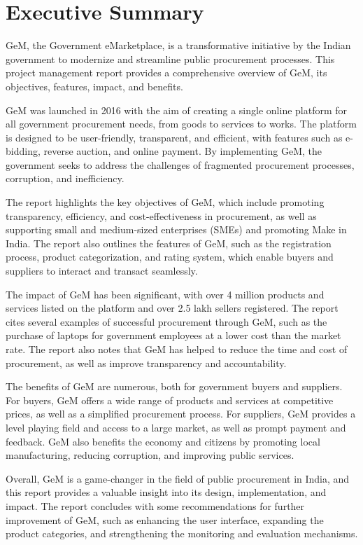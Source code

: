 \newpage
{}
\section*{Executive Summary}
GeM, the Government eMarketplace, is a transformative initiative by the Indian government to modernize and streamline public procurement processes. This project management report provides a comprehensive overview of GeM, its objectives, features, impact, and benefits.

GeM was launched in 2016 with the aim of creating a single online platform for all government procurement needs, from goods to services to works. The platform is designed to be user-friendly, transparent, and efficient, with features such as e-bidding, reverse auction, and online payment. By implementing GeM, the government seeks to address the challenges of fragmented procurement processes, corruption, and inefficiency.

The report highlights the key objectives of GeM, which include promoting transparency, efficiency, and cost-effectiveness in procurement, as well as supporting small and medium-sized enterprises (SMEs) and promoting Make in India. The report also outlines the features of GeM, such as the registration process, product categorization, and rating system, which enable buyers and suppliers to interact and transact seamlessly.

The impact of GeM has been significant, with over 4 million products and services listed on the platform and over 2.5 lakh sellers registered. The report cites several examples of successful procurement through GeM, such as the purchase of laptops for government employees at a lower cost than the market rate. The report also notes that GeM has helped to reduce the time and cost of procurement, as well as improve transparency and accountability.

The benefits of GeM are numerous, both for government buyers and suppliers. For buyers, GeM offers a wide range of products and services at competitive prices, as well as a simplified procurement process. For suppliers, GeM provides a level playing field and access to a large market, as well as prompt payment and feedback. GeM also benefits the economy and citizens by promoting local manufacturing, reducing corruption, and improving public services.

Overall, GeM is a game-changer in the field of public procurement in India, and this report provides a valuable insight into its design, implementation, and impact. The report concludes with some recommendations for further improvement of GeM, such as enhancing the user interface, expanding the product categories, and strengthening the monitoring and evaluation mechanisms.

\newpage
